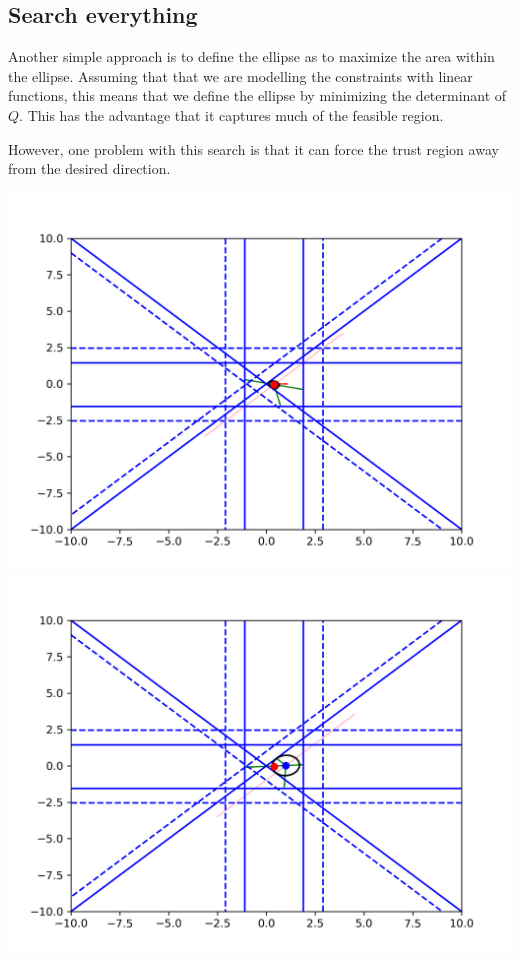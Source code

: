 \documentclass{article}
\begin{document}
\subsection{Search everything}
Another simple approach is to define the ellipse as to maximize the area within the ellipse.
Assuming that that we are modelling the constraints with linear functions, this means that we define the ellipse by minimizing the determinant of $Q$.
This has the advantage that it captures much of the feasible region.


However, one problem with this search is that it can force the trust region away from the desired direction.

\includegraphics[scale=0.2]{everything_runs_1.png}
\includegraphics[scale=0.2]{everything_runs_2.png}
\end{document}
